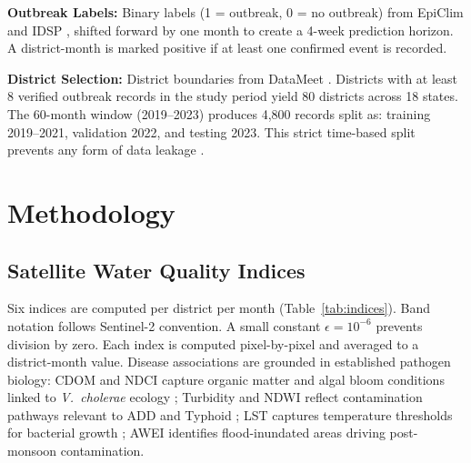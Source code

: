 \documentclass[conference]{IEEEtran}
\begin{document}
\textbf{Outbreak Labels:} Binary labels (1 = outbreak, 0 = no outbreak)
from EpiClim \cite{epiclim2025} and IDSP \cite{idsp2025}, shifted
forward by one month to create a 4-week prediction horizon. A
district-month is marked positive if at least one confirmed event is
recorded.

\textbf{District Selection:} District boundaries from DataMeet
\cite{datameet2025}. Districts with at least 8 verified outbreak records
in the study period yield 80 districts across 18 states. The 60-month
window (2019--2023) produces 4,800 records split as: training 2019--2021,
validation 2022, and testing 2023. This strict time-based split prevents
any form of data leakage \cite{elhassani2025}.

\section{Methodology}

\subsection{Satellite Water Quality Indices}

Six indices are computed per district per month (Table~\ref{tab:indices}).
Band notation follows Sentinel-2 convention. A small constant
$\epsilon = 10^{-6}$ prevents division by zero. Each index is computed
pixel-by-pixel and averaged to a district-month value. Disease
associations are grounded in established pathogen biology: CDOM and NDCI
capture organic matter and algal bloom conditions linked to
\textit{V.~cholerae} ecology \cite{oliva2022}; Turbidity and NDWI
reflect contamination pathways relevant to ADD and Typhoid
\cite{wang2024}; LST captures temperature thresholds for bacterial
growth \cite{campbell2020}; AWEI identifies flood-inundated areas
driving post-monsoon contamination.
\end{document}

